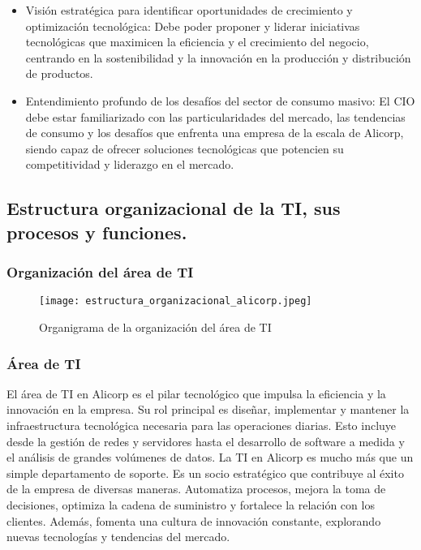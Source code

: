\begin{itemize}
            \item Visión estratégica para identificar oportunidades de crecimiento y optimización tecnológica: Debe poder proponer y liderar iniciativas tecnológicas que maximicen la eficiencia y el crecimiento del negocio, centrando en la sostenibilidad y la innovación en la producción y distribución de productos. 
            \item Entendimiento profundo de los desafíos del sector de consumo masivo: El CIO debe estar familiarizado con las particularidades del mercado, las tendencias de consumo y los desafíos que enfrenta una empresa de la escala de Alicorp, siendo capaz de ofrecer soluciones tecnológicas que potencien su competitividad y liderazgo en el mercado. 
        \end{itemize}


\subsection{Estructura organizacional de la TI, sus procesos y funciones.}



    \subsubsection{Organización del área de TI}
            \begin{figure}[!ht]
                \centering
                \texttt{[image: estructura\_organizacional\_alicorp.jpeg]}
                \caption{Organigrama  de la organización del área de TI}
            \end{figure}

    \subsubsection{Área de TI}
        El área de TI en Alicorp es el pilar tecnológico que impulsa la eficiencia y la innovación en la empresa. Su rol principal es diseñar, implementar y mantener la infraestructura tecnológica necesaria para las operaciones diarias. Esto incluye desde la gestión de redes y servidores hasta el desarrollo de software a medida y el análisis de grandes volúmenes de datos. 
        La TI en Alicorp es mucho más que un simple departamento de soporte. Es un socio estratégico que contribuye al éxito de la empresa de diversas maneras. Automatiza procesos, mejora la toma de decisiones, optimiza la cadena de suministro y fortalece la relación con los clientes. Además, fomenta una cultura de innovación constante, explorando nuevas tecnologías y tendencias del mercado. 

